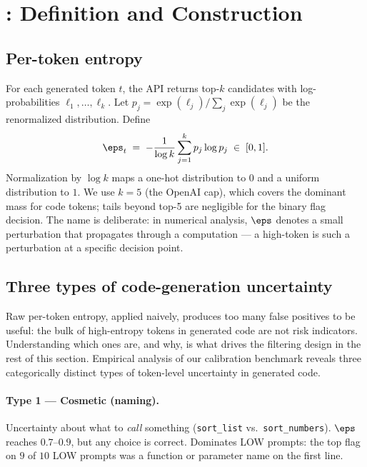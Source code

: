 \section{\eps: Definition and Construction}
\label{sec:epsilon}

\subsection{Per-token entropy}
\label{subsec:per-token}

For each generated token $t$, the API returns top-$k$ candidates with
log-probabilities $\ell_1, \dots, \ell_k$. Let
$p_j = \exp(\ell_j) / \sum_j \exp(\ell_j)$ be the renormalized
distribution. Define
\begin{equation}
    \eps_t \;=\; -\frac{1}{\log k} \sum_{j=1}^{k} p_j \log p_j \;\in\; [0,1].
    \label{eq:eps}
\end{equation}
Normalization by $\log k$ maps a one-hot distribution to $0$ and a
uniform distribution to $1$. We use $k=5$ (the OpenAI cap), which
covers the dominant mass for code tokens; tails beyond top-5 are
negligible for the binary flag decision. The name is
deliberate: in numerical analysis, $\eps$ denotes a small perturbation
that propagates through a computation --- a high-\eps token is such
a perturbation at a specific decision point.

\subsection{Three types of code-generation uncertainty}
\label{subsec:types}

Raw per-token entropy, applied naively, produces too many false positives
to be useful: the bulk of high-entropy tokens in generated code are not
risk indicators. Understanding which ones are, and why, is what drives
the filtering design in the rest of this section. Empirical analysis of
our calibration benchmark reveals three categorically distinct types of
token-level uncertainty in generated code.

\paragraph{Type 1 --- Cosmetic (naming).} Uncertainty about what to
\emph{call} something (\texttt{sort\_list} vs.\ \texttt{sort\_numbers}).
$\eps$ reaches $0.7$--$0.9$, but any choice is correct. Dominates LOW
prompts: the top flag on $9$ of $10$ LOW prompts was a function or
parameter name on the first line.

